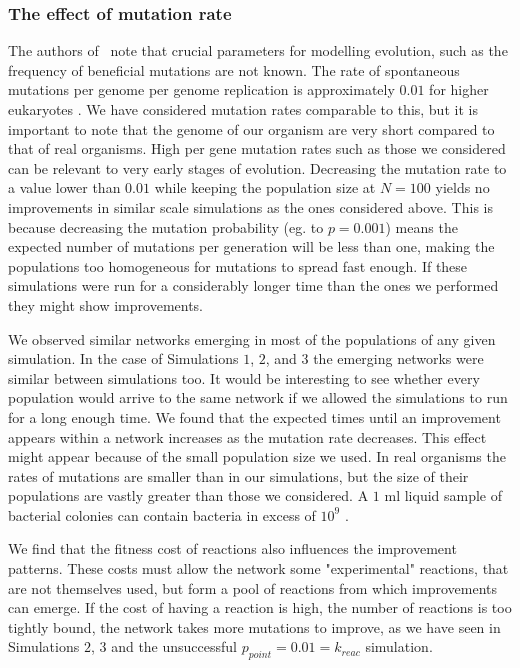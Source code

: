 \documentclass[a4paper,12pt]{article}
\begin{document}
\subsubsection*{The effect of mutation rate}
\label{sub:on_the_effect_of_the_probability_of_mutation}


The authors of \cite{predictability}~note that crucial parameters for modelling evolution, such as the frequency of beneficial mutations are not known. The rate of spontaneous mutations per genome per genome replication is approximately $0.01$ for higher eukaryotes \cite{mutationrate}. We have considered mutation rates comparable to this, but it is important to note that the genome of our organism are very short compared to that of real organisms. High per gene mutation rates such as those we considered can be relevant to very early stages of evolution. Decreasing the mutation rate to a value lower than $0.01$ while keeping the population size at $N=100$ yields no improvements in similar scale simulations as the ones considered above. This is because decreasing the mutation probability (eg. to $p=0.001$) means the expected number of mutations per generation will be less than one, making the populations too homogeneous for mutations to spread fast enough. If these simulations were run for a considerably longer time than the ones we performed they might show improvements. 

We observed similar networks emerging in most of the populations of any given simulation. In the case of Simulations $1$, $2$, and $3$ the emerging networks were similar between simulations too. It would be interesting to see whether every population would arrive to the same network if we allowed the simulations to run for a long enough time. We found that the expected times until an improvement appears within a network increases as the mutation rate decreases. This effect might appear because of the small population size we used. In real organisms the rates of mutations are smaller than in our simulations, but the size of their populations are vastly greater than those we considered. A $1$ ml liquid sample of bacterial colonies can contain bacteria in excess of $10^9$ \cite{barteklecture}.

We find that the fitness cost of reactions also influences the improvement patterns. These costs must allow the network some "experimental" reactions, that are not themselves used, but form a pool of reactions from which improvements can emerge. If the cost of having a reaction is high, the number of reactions is too tightly bound, the network takes more mutations to improve, as we have seen in Simulations $2$, $3$ and the unsuccessful $p_{point}=0.01=k_{reac}$ simulation.
\end{document}

